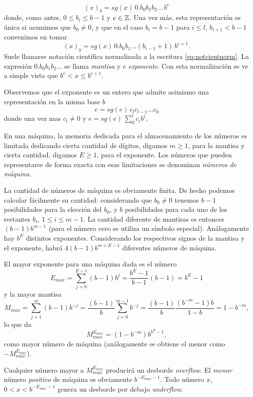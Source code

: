 \begin{equation}
 \label{eq:notcientnorm}
(x)_b=sg(x) \, 0.b_0b_1b_2...\, b^{e}
\end{equation}
donde, como antes, $0\le b_i\le b-1$ y $e\in \mathbb Z$.
Una vez más, esta representación es única si asumimos que $b_0\neq 0$, y que en el caso $b_i=b-1$ para $i\le l$, $b_{i+1}<b-1$
convenimos en tomar
$$
(x)_b=sg(x)\, 0.b_0b_1...(b_{i-1}+1)\, b^{e+1}.
$$
Suele llamarse notación científica normalizada a la escritura \eqref{eq:notcientnorm}. La expresión  $0.b_0b_1b_2...$ se llama \emph{mantisa} y $e$  \emph{exponente}. Con esta normalización se ve a simple vista que $b^e< x\le b^{e+1}$.

Observemos que el exponente es un entero que admite asimismo una representación en la misma base $b$
$$e=sg(e)\, c_lc_{l-1}...c_{0}$$
donde una vez mas $c_l\neq 0$ y
$e=sg(e)\, \sum_0^{l}c_ib^i$.

En una máquina, la memoria dedicada para el almacenamiento de los números es limitada dedicando cierta cantidad de dígitos, digamos $m\ge 1$, para la mantisa y cierta cantidad, digamos $E\ge 1$, para el exponente. Los números que pueden representarse de forma exacta con esas limitaciones se denominan \emph{números de máquina}.

La cantidad de números de máquina es obviamente finita.  De hecho podemos calcular fácilmente su cantidad: considerando que $b_0\neq 0$ tenemos $b-1$ posibilidades para la elección del $b_0$, y $b$ posibilidades para cada uno de los restantes $b_i$, $1\le i\le m-1$. La cantidad diferente de mantisas es entonces $(b-1)b^{m-1}$ (para el número cero se utiliza un símbolo especial). Análogamente hay $b^{E}$ distintos exponentes. Considerando los respectivos signos de la mantisa y el exponente, habrá
$4(b-1)b^{m+E-1}$ diferentes números de máquina.

El mayor exponente para una máquina dada es el número
$$E_{max}=\sum_{j=0}^{E-1}(b-1)b^j=\frac{b^E-1}{b-1}(b-1)=b^E-1$$ y la mayor mantisa $$M_{max}=\sum_{j=1}^{m}(b-1)b^{-j}=\frac{(b-1)}{b}\sum_{j=0}^{m-1}b^{-j}=\frac{(b-1)}{b}\frac{(b^{-m}-1)b}{1-b}=1-b^{-m},$$ lo que da
$$
M_{max}^{E_{max}}=\left(1-b^{-m}\right)b^{b^E-1},
$$
como mayor número de máquina (análogamente se obtiene el menor como $-M_{max}^{E_{max}}$).

Cualquier número mayor a $M_{max}^{E_{max}}$ producirá  un desborde \emph{overflow}. El \emph{menor} número \emph{positivo} de máquina es obviamente $b^{-E_{max}-1}$. Todo número $x$, $0<x<b^{-E_{max}-1}$ genera un desborde por debajo \emph{underflow}.

